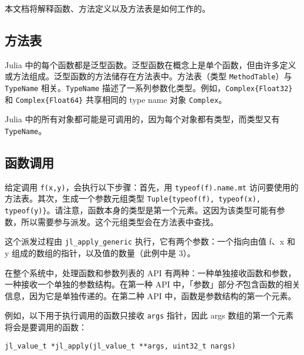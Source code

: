 本文档将解释函数、方法定义以及方法表是如何工作的。



\hypertarget{6316722227009052903}{}


\subsection{方法表}



Julia 中的每个函数都是泛型函数。泛型函数在概念上是单个函数，但由许多定义或方法组成。泛型函数的方法储存在方法表中。方法表（类型 \texttt{MethodTable}）与 \texttt{TypeName} 相关。\texttt{TypeName} 描述了一系列参数化类型。例如，\texttt{Complex\{Float32\}} 和 \texttt{Complex\{Float64\}} 共享相同的 type name 对象 \texttt{Complex}。



Julia 中的所有对象都可能是可调用的，因为每个对象都有类型，而类型又有 \texttt{TypeName}。



\hypertarget{13252419531822255004}{}


\subsection{函数调用}



给定调用 \texttt{f(x,y)}，会执行以下步骤：首先，用 \texttt{typeof(f).name.mt} 访问要使用的方法表。其次，生成一个参数元组类型 \texttt{Tuple\{typeof(f), typeof(x), typeof(y)\}}。请注意，函数本身的类型是第一个元素。这因为该类型可能有参数，所以需要参与派发。这个元组类型会在方法表中查找。



这个派发过程由 \texttt{jl\_apply\_generic} 执行，它有两个参数：一个指向由值 f、x 和 y 组成的数组的指针，以及值的数量（此例中是 3）。



在整个系统中，处理函数和参数列表的 API 有两种：一种单独接收函数和参数，一种接收一个单独的参数结构。在第一种 API 中，「参数」部分\emph{不}包含函数的相关信息，因为它是单独传递的。在第二种 API 中，函数是参数结构的第一个元素。



例如，以下用于执行调用的函数只接收 \texttt{args} 指针，因此 args 数组的第一个元素将会是要调用的函数：




\begin{lstlisting}
jl_value_t *jl_apply(jl_value_t **args, uint32_t nargs)
\end{lstlisting}




